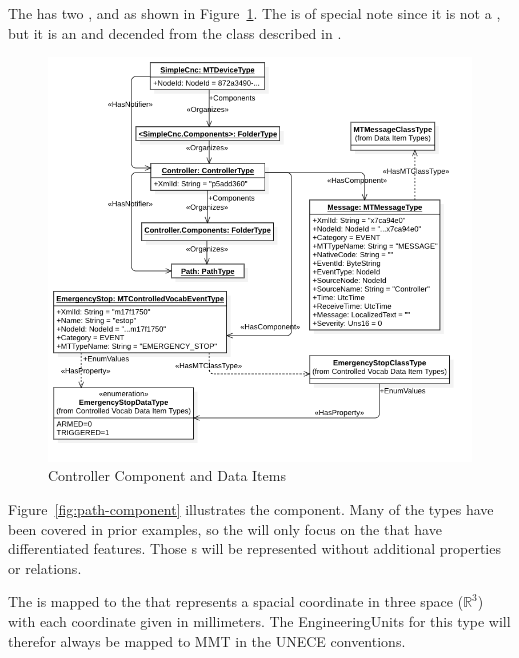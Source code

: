 The  has two ,  and  as shown in Figure~\ref{fig:controller-component}. The  is of special note since it is not a , but it is an  and decended from the  class described in \cite{UAPart5}.

\begin{figure}[ht]
  \centering
  \includegraphics[width=1.0\textwidth]{diagrams/mtconnect-mapping/controller-component.png}
  \caption{Controller Component and Data Items}
  \label{fig:controller-component}
\end{figure}

Figure~\ref{fig:path-component} illustrates the  component. Many of the  types have been covered in prior examples, so the  will only focus on the  that have differentiated features. Those s will be represented without additional properties or relations.

The  is mapped to the  that represents a spacial coordinate in three space ($\mathbb{R}^{3}$) with each coordinate given in millimeters. The EngineeringUnits for this type will therefor always be mapped to MMT in the UNECE conventions.

